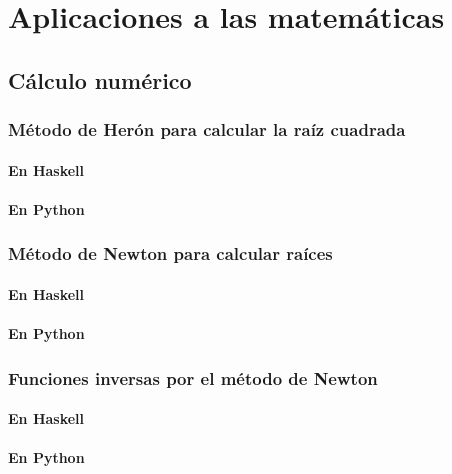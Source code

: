 \documentclass[a4paper,12pt,twoside]{book}
\begin{document}
\part{Aplicaciones a las matemáticas}

\chapter{Cálculo numérico}

\minitoc

\section{Método de Herón para calcular la raíz cuadrada}
\subsection{En Haskell}
\subsection{En Python}

\section{Método de Newton para calcular raíces}
\subsection{En Haskell}
\subsection{En Python}

\section{Funciones inversas por el método de Newton}
\subsection{En Haskell}
\subsection{En Python}
\end{document}

